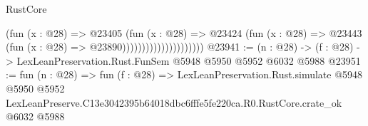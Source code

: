 \begin{lexlean}{RustCore}
\begin{coremodule}
                                      (fun (x : @28) =>
                                      @23405
                                        (fun (x : @28) =>
                                        @23424
                                          (fun (x : @28) =>
                                          @23443 (fun (x : @28) => @23890)))))))))))))))))))))
@23941 := (n : @28) -> (f : @28) -> LexLeanPreservation.Rust.FunSem @5948 @5950 @5952 @6032 @5988
@23951 := fun (n : @28) =>
  fun (f : @28) =>
  LexLeanPreservation.Rust.simulate
    @5948
    @5950
    @5952
    LexLeanPreserve.C13e3042395b64018dbc6fffe5fe220ca.R0.RustCore.crate_ok
    @6032
    @5988
\end{coremodule}
\end{lexlean}

